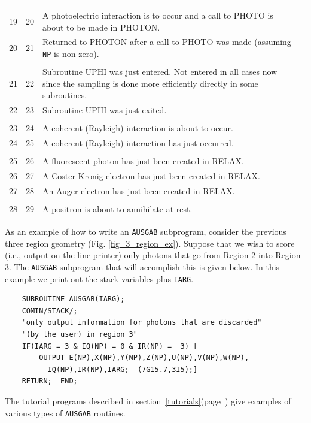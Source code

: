 \begin{table}[htbp]
\begin{center}
\begin{tabular}{ c c   p{125mm}l }
&&\\
19&20& A photoelectric interaction is to occur and a call
             to PHOTO is about to be made in PHOTON.\\
20&21& Returned to PHOTON after a call to PHOTO was made
             (assuming {\tt NP} is non-zero).\\
&&\\
21&22& Subroutine UPHI was just entered. Not entered in
all cases now since the sampling is done more efficiently directly in some
subroutines.\\
22&23& Subroutine UPHI was just exited.\\
&&\\
23&24& A coherent (Rayleigh) interaction is about to occur.\\
24&25& A coherent (Rayleigh) interaction has just occurred.\\
&&\\
25 &26& A fluorescent photon has just been created in RELAX.\\
26 & 27& A Coster-Kronig electron has just been created in RELAX.\\
27 &28& An Auger electron has just been created in RELAX.\\
&&\\
28 &29& A positron is about to annihilate at rest.\\
\hline
\end{tabular}
\end{center}
\end{table}

As an example of how to write an {\tt AUSGAB} subprogram, consider the previous
three region geometry (Fig. \ref{fig_3_region_ex}).  Suppose that we wish to
score (i.e., output on the line printer) only photons that go from Region 2
into Region 3.  The {\tt AUSGAB} subprogram that will accomplish this is given
below.  In this example we print out the stack variables plus {\tt IARG}.
\begin{verbatim}
    SUBROUTINE AUSGAB(IARG);
    COMIN/STACK/;
    "only output information for photons that are discarded"
    "(by the user) in region 3"
    IF(IARG = 3 & IQ(NP) = 0 & IR(NP) =  3) [
        OUTPUT E(NP),X(NP),Y(NP),Z(NP),U(NP),V(NP),W(NP),
          IQ(NP),IR(NP),IARG;  (7G15.7,3I5);]
    RETURN;  END;
\end{verbatim}
The tutorial programs described in
section~\ref{tutorials}(page~\pageref{tutorials}) give examples of various
types of {\tt AUSGAB} routines.

